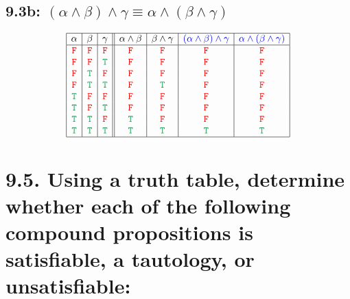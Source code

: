 \documentclass{article}
\begin{document}
\subsection*{9.3b: $(\alpha\land\beta)\land\gamma\equiv\alpha\land(\beta\land\gamma)$}
\[\begin{array}{|c|c|c||c|c|c|c|}
\hline
\alpha&\beta&\gamma&\alpha\land\beta&\beta\land\gamma&\textcolor{blue}{(\alpha\land\beta)\land\gamma}&\textcolor{blue}{\alpha\land(\beta\land\gamma)}\\
\hline
\textcolor{red}{\tt{F}}&\textcolor{red}{\tt{F}}&\textcolor{red}{\tt{F}}&\textcolor{red}{\tt{F}}&\textcolor{red}{\tt{F}}&\textcolor{red}{\tt{F}}&\textcolor{red}{\tt{F}}\\
\textcolor{red}{\tt{F}}&\textcolor{red}{\tt{F}}&\textcolor{ForestGreen}{\tt{T}}&\textcolor{red}{\tt{F}}&\textcolor{red}{\tt{F}}&\textcolor{red}{\tt{F}}&\textcolor{red}{\tt{F}}\\
\textcolor{red}{\tt{F}}&\textcolor{ForestGreen}{\tt{T}}&\textcolor{red}{\tt{F}}&\textcolor{red}{\tt{F}}&\textcolor{red}{\tt{F}}&\textcolor{red}{\tt{F}}&\textcolor{red}{\tt{F}}\\
\textcolor{red}{\tt{F}}&\textcolor{ForestGreen}{\tt{T}}&\textcolor{ForestGreen}{\tt{T}}&\textcolor{red}{\tt{F}}&\textcolor{ForestGreen}{\tt{T}}&\textcolor{red}{\tt{F}}&\textcolor{red}{\tt{F}}\\
\textcolor{ForestGreen}{\tt{T}}&\textcolor{red}{\tt{F}}&\textcolor{red}{\tt{F}}&\textcolor{red}{\tt{F}}&\textcolor{red}{\tt{F}}&\textcolor{red}{\tt{F}}&\textcolor{red}{\tt{F}}\\
\textcolor{ForestGreen}{\tt{T}}&\textcolor{red}{\tt{F}}&\textcolor{ForestGreen}{\tt{T}}&\textcolor{red}{\tt{F}}&\textcolor{red}{\tt{F}}&\textcolor{red}{\tt{F}}&\textcolor{red}{\tt{F}}\\
\textcolor{ForestGreen}{\tt{T}}&\textcolor{ForestGreen}{\tt{T}}&\textcolor{red}{\tt{F}}&\textcolor{ForestGreen}{\tt{T}}&\textcolor{red}{\tt{F}}&\textcolor{red}{\tt{F}}&\textcolor{red}{\tt{F}}\\
\textcolor{ForestGreen}{\tt{T}}&\textcolor{ForestGreen}{\tt{T}}&\textcolor{ForestGreen}{\tt{T}}&\textcolor{ForestGreen}{\tt{T}}&\textcolor{ForestGreen}{\tt{T}}&\textcolor{ForestGreen}{\tt{T}}&\textcolor{ForestGreen}{\tt{T}}\\
\hline
\end{array}\]
\section*{9.5. Using a truth table, determine whether each of the following compound propositions is satisfiable, a tautology, or unsatisfiable:}
\end{document}
